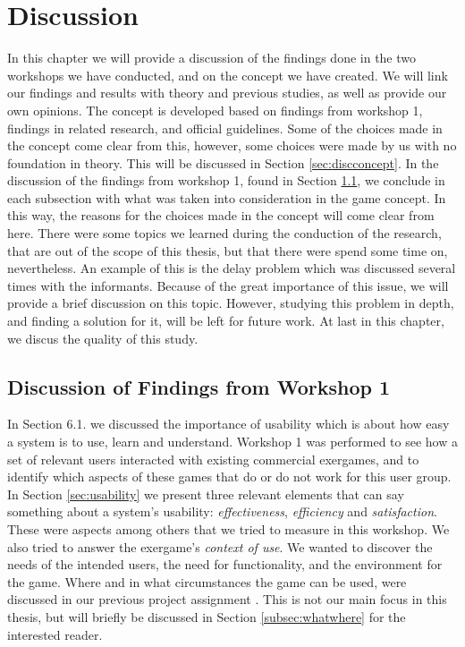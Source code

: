 \chapter{Discussion}
\label{chap:discussion}

In this chapter we will provide a discussion of the findings done in the two workshops we have conducted, and on the concept we have created. We will link our findings and results with theory and previous studies, as well as provide our own opinions. The concept is developed based on findings from workshop 1, findings in related research, and official guidelines. Some of the choices made in the concept come clear from this, however, some choices were made by us with no foundation in theory. This will be discussed in Section \ref{sec:discconcept}. In the discussion of the findings from workshop 1, found in Section \ref{sec:discfindings1}, we conclude in each subsection with what was taken into consideration in the game concept. In this way, the reasons for the choices made in the concept will come clear from here. There were some topics we learned during the conduction of the research, that are out of the scope of this thesis, but that there were spend some time on, nevertheless. An example of this is the delay problem which was discussed several times with the informants. Because of the great importance of this issue, we will provide a brief discussion on this topic. However, studying this problem in depth, and finding a solution for it, will be left for future work. At last in this chapter, we discus the quality of this study.

\section{Discussion of Findings from Workshop 1}
\label{sec:discfindings1}

In Section 6.1. we discussed the importance of usability which is about how easy a system is to use, learn and understand. Workshop 1 was performed to see how a set of relevant users interacted with existing commercial exergames, and to identify which aspects of these games that do or do not work for this user group. In Section \ref{sec:usability} we present three relevant elements that can say something about a system's usability: \emph{effectiveness}, \emph{efficiency}  and \emph{satisfaction}. These were aspects among others that we tried to measure in this workshop. We also tried to answer the exergame's \emph{context of use}. We wanted to discover the needs of the intended users, the need for functionality, and the environment for the game. Where and in what circumstances the game can be used, were discussed in our previous project assignment \cite{project}. This is not our main focus in this thesis, but will briefly be discussed in Section \ref{subsec:whatwhere} for the interested reader.


